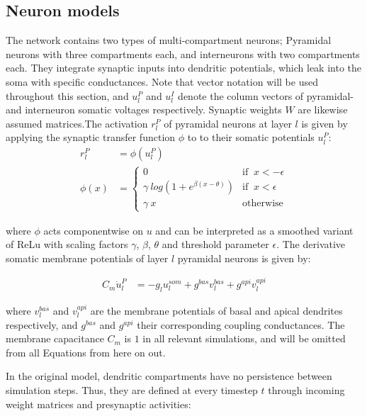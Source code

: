 \subsection{Neuron models}\label{sec-neurons}



The network contains two types of multi-compartment neurons; Pyramidal neurons with three compartments each, and
interneurons with two compartments each. They integrate synaptic inputs into dendritic potentials, which leak into the
soma with specific conductances. Note that vector notation will be used throughout this section, and $u_l^P$ and $u_l^I$
denote the column vectors of pyramidal- and interneuron somatic voltages respectively. Synaptic weights $W$ are likewise
assumed matrices.The activation $r_l^P$ of pyramidal neurons at layer $l$ is given by applying the synaptic transfer
function $\phi$ to to their somatic potentials $u_l^P$:
\begin{align}
  r_l^P   & = \phi(u_l^P)                                                        \\
  \phi(x) & = \begin{cases}
                0                                   & \textrm{if } \ x < -\epsilon \\
                \gamma \ log(1+e^{\beta(x-\theta)}) & \textrm{if } \ x < \epsilon  \\
                \gamma \ x                          & \textrm{otherwise}
              \end{cases}
\end{align}

where $\phi$ acts componentwise on $u$ and can be interpreted as a smoothed variant of ReLu  with scaling
factors $\gamma$, $\beta$, $\theta$ and threshold parameter $\epsilon$. The derivative somatic membrane potentials of
layer $l$ pyramidal neurons is given by:

\begin{align}
  C_m \dot{u}_l^P & = - g_l u_l^{som} + g^{bas} v_l^{bas} + g^{api} v_l^{api} \label{eq-pyr-dynamics-rate}
\end{align}

where $v_l^{bas}$ and $v_l^{api}$ are the membrane potentials of basal and apical dendrites respectively, and $g^{bas}$
and $g^{api}$ their corresponding coupling conductances. The membrane capacitance $C_m$ is $1$ in all relevant
simulations, and will be omitted from all Equations from here on out.


In the original model, dendritic compartments have no persistence between simulation steps. Thus, they are defined at
every timestep $t$ through incoming weight matrices and presynaptic activities:

